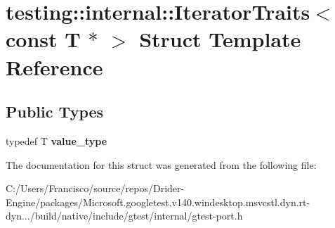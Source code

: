 \hypertarget{structtesting_1_1internal_1_1_iterator_traits_3_01const_01_t_01_5_01_4}{}\section{testing\+:\+:internal\+:\+:Iterator\+Traits$<$ const T $\ast$ $>$ Struct Template Reference}
\label{structtesting_1_1internal_1_1_iterator_traits_3_01const_01_t_01_5_01_4}
\subsection*{Public Types}
\begin{DoxyCompactItemize}
\item 
\mbox{\label{structtesting_1_1internal_1_1_iterator_traits_3_01const_01_t_01_5_01_4_ae7c8867223e106f374b56a7dc4a85547}} 
typedef T {\bfseries value\+\_\+type}
\end{DoxyCompactItemize}


The documentation for this struct was generated from the following file\+:\begin{DoxyCompactItemize}
\item 
C\+:/\+Users/\+Francisco/source/repos/\+Drider-\/\+Engine/packages/\+Microsoft.\+googletest.\+v140.\+windesktop.\+msvcstl.\+dyn.\+rt-\/dyn.../build/native/include/gtest/internal/gtest-\/port.\+h\end{DoxyCompactItemize}
